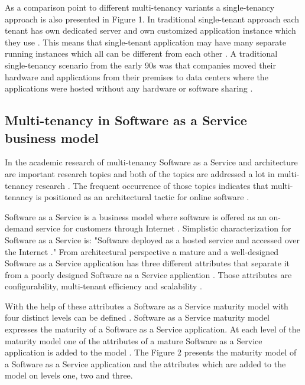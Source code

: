 \documentclass[conference]{sasmoota2017}
\begin{document}
As a comparison point to different multi-tenancy variants a single-tenancy approach is also presented in Figure 1. In traditional single-tenant approach each tenant has own dedicated server and own customized application instance which they use \cite{Bezemer:2010:MaintenanceDream}. This means that single-tenant application may have many separate running instances which all can be different from each other \cite{Bezemer:2010:MaintenanceDream}. A traditional single-tenancy scenario from the early 90s was that companies moved their hardware and applications from their premises to data centers where the applications were hosted without any hardware or software sharing \cite{Guo:2007:FrameworkForNative}. 

\subsection{Multi-tenancy in Software as a Service business model}

In the academic research of multi-tenancy Software as a Service and architecture are important research topics and both of the topics are addressed a lot in multi-tenancy research \cite{Kabbedijk2015:Defining}. The frequent occurrence of those topics indicates that multi-tenancy is positioned as an architectural tactic for online software \cite{Kabbedijk2015:Defining}. 

Software as a Service is a business model where software is offered as an on-demand service for customers through Internet \cite{Bezemer:2010:MaintenanceDream}. Simplistic characterization for Software as a Service is: "Software deployed as a hosted service and accessed over the Internet \cite{Carraro:2006:ArchitectureLongTail}." From architectural perspective a mature and a well-designed Software as a Service application has three different attributes that separate it from a poorly designed Software as a Service application \cite{Carraro:2006:ArchitectureLongTail}. Those attributes are configurability, multi-tenant efficiency and scalability \cite{Carraro:2006:ArchitectureLongTail}.

With the help of these attributes a Software as a Service maturity model with four distinct levels can be defined \cite{Carraro:2006:ArchitectureLongTail}. Software as a Service maturity model expresses the maturity of a Software as a Service application. At each level of the maturity model one of the attributes of a mature Software as a Service application is added to the model \cite{Carraro:2006:ArchitectureLongTail}. The Figure 2 presents the maturity model of a Software as a Service application and the attributes which are added to the model on levels one, two and three. 
\end{document}
